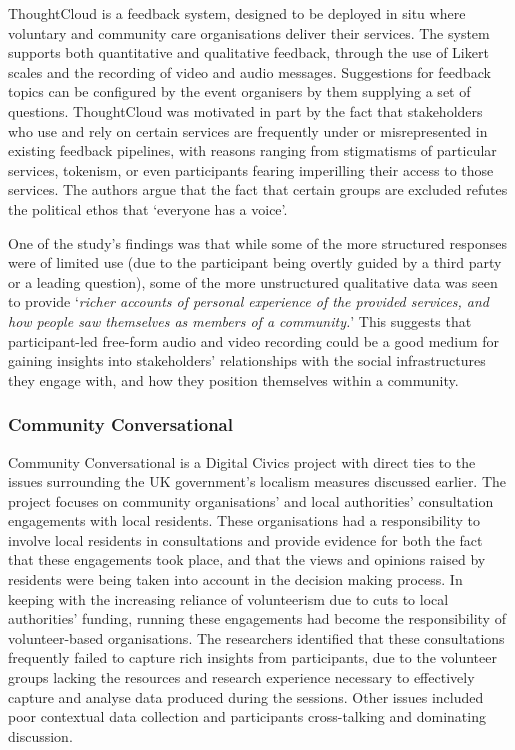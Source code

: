 ThoughtCloud \citep{Dow2016} is a feedback system, designed to be deployed in situ where voluntary and community care organisations deliver their services. The system supports both quantitative and qualitative feedback, through the use of Likert scales and the recording of video and audio messages. Suggestions for feedback topics can be configured by the event organisers by them supplying a set of questions. ThoughtCloud was motivated in part by the fact that stakeholders who use and rely on certain services are frequently under or misrepresented in existing feedback pipelines, with reasons ranging from stigmatisms of particular services, tokenism, or even participants fearing imperilling their access to those services. The authors argue that the fact that certain groups are excluded refutes the political ethos that `everyone has a voice'.

One of the study's findings was that while some of the more structured responses were of limited use (due to the participant being overtly guided by a third party or a leading question), some of the more unstructured qualitative data was seen to provide `\textit{richer accounts of personal experience of the provided services, and how people saw themselves as members of a community.}' This suggests that participant-led free-form audio and video recording could be a good medium for gaining insights into stakeholders' relationships with the social infrastructures they engage with, and how they position themselves within a community.

\subsubsection{Community Conversational}

Community Conversational \citep{Johnson2017} is a Digital Civics project with direct ties to the issues surrounding the UK government's localism measures discussed earlier. The project focuses on community organisations' and local authorities' consultation engagements with local residents. These organisations had a responsibility to involve local residents in consultations and provide evidence for both the fact that these engagements took place, and that the views and opinions raised by residents were being taken into account in the decision making process. In keeping with the increasing reliance of volunteerism due to cuts to local authorities' funding, running these engagements had become the responsibility of volunteer-based organisations. The researchers identified that these consultations frequently failed to capture rich insights from participants, due to the volunteer groups lacking the resources and research experience necessary to effectively capture and analyse data produced during the sessions. Other issues included poor contextual data collection and participants cross-talking and dominating discussion. 


